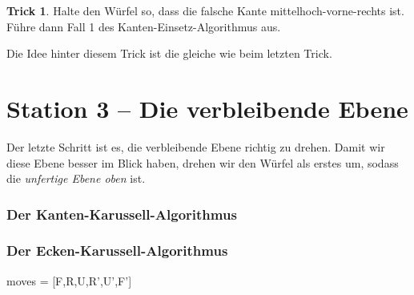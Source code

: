 \documentclass[12pt]{scrartcl}
\newcounter{fallCounter}
\theoremstyle{definition}
\newcounter{trickCounter}
\newtheorem{trickk}[trickCounter]{Trick}
\newenvironment{trick}
  {\setcounter{trickCounter}{16}\begin{trickk}}
  {\end{trickk}}
\newenvironment{algorithm}
  {\setcounter{fallCounter}{0}\vspace{15pt}\begin{mdframed}[backgroundcolor=blue!15]}
  {\end{mdframed}\vspace{15pt}}
\begin{document}
\begin{trick}
  Halte den Würfel so, dass die falsche Kante mittelhoch-vorne-rechts ist. Führe dann Fall 1 des Kanten-Einsetz-Algorithmus aus.
\end{trick}

Die Idee hinter diesem Trick ist die gleiche wie beim letzten Trick.

\pagebreak

\section{Station 3 -- Die verbleibende Ebene}

Der letzte Schritt ist es, die verbleibende Ebene richtig zu drehen. Damit wir diese Ebene besser im Blick haben, drehen wir den Würfel als erstes um, sodass die \emph{unfertige Ebene oben} ist.

\begin{algorithm}
  \subsubsection{Der Kanten-Karussell-Algorithmus}
\end{algorithm}

\begin{algorithm}
  \subsubsection{Der Ecken-Karussell-Algorithmus}
      moves = [F,R,U,R',U',F']
\end{algorithm}
\end{document}
